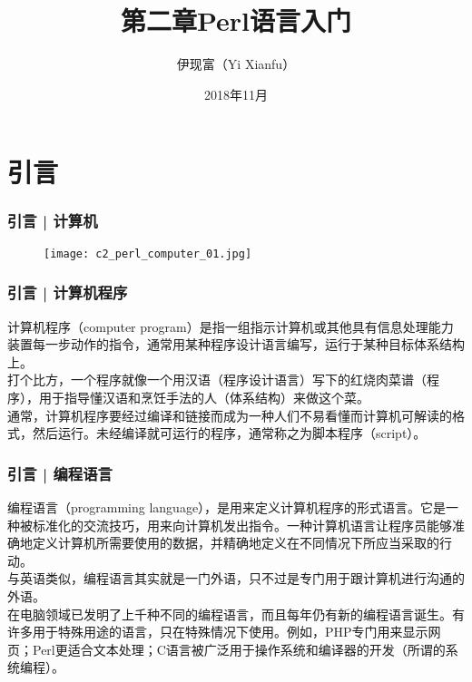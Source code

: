 



\title[Perl语言入门]{第二章\quad Perl语言入门}
\author[Yixf]{伊现富（Yi Xianfu）}
\date{2018年11月}



\section{引言}
\begin{frame}
  \frametitle{引言 | 计算机}
  \begin{figure}
    \centering
    \texttt{[image: c2\_perl\_computer\_01.jpg]}
  \end{figure}
\end{frame}

\begin{frame}
  \frametitle{引言 | 计算机程序}
  计算机程序（computer program）是指一组指示计算机或其他具有信息处理能力装置每一步动作的\alert{指令}，通常用某种程序设计语言编写，运行于某种目标体系结构上。\\
  \vspace{1em}
  打个比方，一个程序就像一个用汉语（程序设计语言）写下的红烧肉菜谱（程序），用于指导懂汉语和烹饪手法的人（体系结构）来做这个菜。\\
  \vspace{1em}
  通常，计算机程序要经过编译和链接而成为一种人们不易看懂而计算机可解读的格式，然后运行。未经编译就可运行的程序，通常称之为脚本程序（script）。
\end{frame}

\begin{frame}
  \frametitle{引言 | 编程语言}
编程语言（programming language），是用来定义计算机程序的形式语言。它是一种被标准化的交流技巧，用来向计算机发出指令。一种计算机语言让程序员能够准确地定义计算机所需要使用的数据，并精确地定义在不同情况下所应当采取的行动。\\
  \vspace{1em}
  与英语类似，编程语言其实就是一门\alert{外语}，只不过是专门用于跟计算机进行沟通的外语。\\
  \vspace{1em}
在电脑领域已发明了上千种不同的编程语言，而且每年仍有新的编程语言诞生。有许多用于特殊用途的语言，只在特殊情况下使用。例如，PHP专门用来显示网页；Perl更适合文本处理；C语言被广泛用于操作系统和编译器的开发（所谓的系统编程）。
\end{frame}

